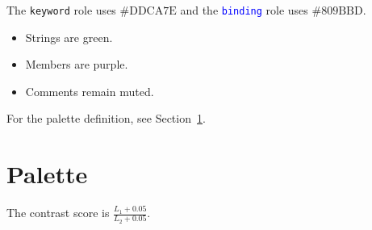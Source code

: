 \documentclass[11pt]{article}
\title{\themename}
\author{Theme Maintainers}
\date{\today}
\newcommand{\token}[2][codepenaccent]{\textcolor{#1}{\texttt{#2}}}
\begin{document}
\maketitle

The \token{keyword} role uses $\#\mathrm{DDCA7E}$ and the
\token[blue]{binding} role uses $\#\mathrm{809BBD}$.

\begin{itemize}
  \item Strings are green.
  \item Members are purple.
  \item Comments remain muted.
\end{itemize}

For the palette definition, see Section~\ref{sec:palette}.
\section{Palette}\label{sec:palette}
The contrast score is $\frac{L_1 + 0.05}{L_2 + 0.05}$.
\end{document}
